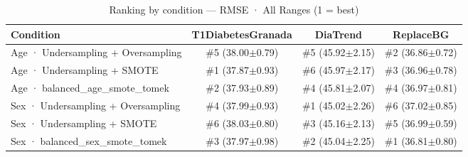 \begin{table}[htbp]
\centering
\small
\caption{Ranking by condition — RMSE · All Ranges  (1 = best)}
\label{tab:ranking_rmse_entire_family_size_same_size}
\begin{tabular}{lccc}
\toprule
\textbf{Condition} & \textbf{T1DiabetesGranada} & \textbf{DiaTrend} & \textbf{ReplaceBG} \\
\midrule
Age · Undersampling + Oversampling & \#5 (38.00$\pm$0.79) & \#5 (45.92$\pm$2.15) & \#2 (36.86$\pm$0.72) \\
Age · Undersampling + SMOTE & \#1 (37.87$\pm$0.93) & \#6 (45.97$\pm$2.17) & \#3 (36.96$\pm$0.78) \\
Age · balanced_age_smote_tomek & \#2 (37.93$\pm$0.89) & \#4 (45.81$\pm$2.07) & \#4 (36.97$\pm$0.81) \\
\midrule
Sex · Undersampling + Oversampling & \#4 (37.99$\pm$0.93) & \#1 (45.02$\pm$2.26) & \#6 (37.02$\pm$0.85) \\
Sex · Undersampling + SMOTE & \#6 (38.03$\pm$0.80) & \#3 (45.16$\pm$2.13) & \#5 (36.99$\pm$0.59) \\
Sex · balanced_sex_smote_tomek & \#3 (37.97$\pm$0.98) & \#2 (45.04$\pm$2.25) & \#1 (36.81$\pm$0.80) \\
\bottomrule
\end{tabular}
\end{table}